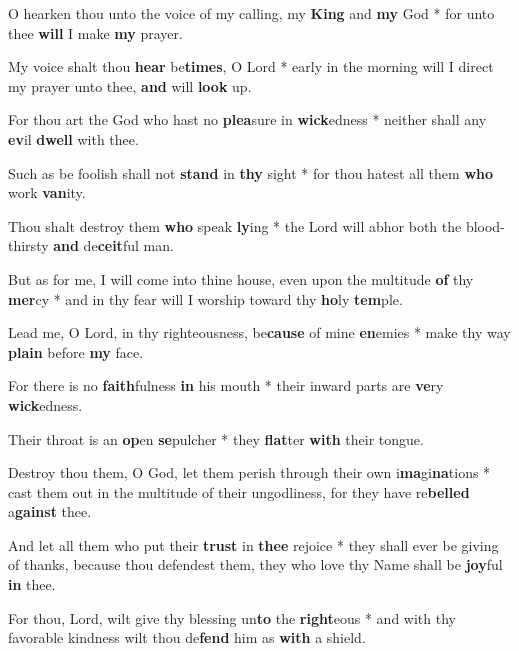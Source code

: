 \begin{multicols}{2}
	O hearken thou unto the voice of my calling, my \textbf{King} and \textbf{my} God * for unto thee \textbf{will} I make \textbf{my} prayer.
	
	My voice shalt thou \textbf{hear} be\textbf{times}, O Lord * early in the morning will I direct my prayer unto thee, \textbf{and} will \textbf{look} up.
	
	For thou art the God who hast no \textbf{plea}sure in \textbf{wick}edness * neither shall any \textbf{ev}il \textbf{dwell} with thee.
	
	Such as be foolish shall not \textbf{stand} in \textbf{thy} sight * for thou hatest all them \textbf{who} work \textbf{van}ity.
	
	Thou shalt destroy them \textbf{who} speak \textbf{ly}ing * the Lord will abhor both the blood-thirsty \textbf{and} de\textbf{ceit}ful man.
	
	But as for me, I will come into thine house, even upon the multitude \textbf{of} thy \textbf{mer}cy * and in thy fear will I worship toward thy \textbf{ho}ly \textbf{tem}ple.
	
	Lead me, O Lord, in thy righteousness, be\textbf{cause} of mine \textbf{en}emies * make thy way \textbf{plain} before \textbf{my} face.
	
	For there is no \textbf{faith}fulness \textbf{in} his mouth * their inward parts are \textbf{ve}ry \textbf{wick}edness.
	
	Their throat is an \textbf{op}en \textbf{se}pulcher * they \textbf{flat}ter \textbf{with} their tongue.
	
	Destroy thou them, O God, let them perish through their own i\textbf{ma}gi\textbf{na}tions * cast them out in the multitude of their ungodliness, for they have re\textbf{belled} a\textbf{gainst} thee.
	
	And let all them who put their \textbf{trust} in \textbf{thee} rejoice * they shall ever be giving of thanks, because thou defendest them, they who love thy Name shall be \textbf{joy}ful \textbf{in} thee.
	
	For thou, Lord, wilt give thy blessing un\textbf{to} the \textbf{right}eous * and with thy favorable kindness wilt thou de\textbf{fend} him as \textbf{with} a shield.
\end{multicols}
